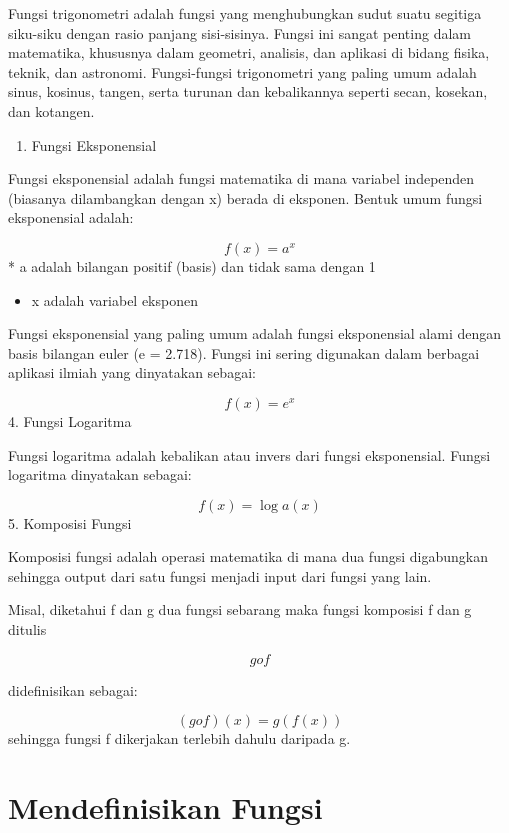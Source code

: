 \documentclass[
]{book}
\providecommand{\tightlist}{%
  \setlength{\itemsep}{0pt}\setlength{\parskip}{0pt}}
\begin{document}
Fungsi trigonometri adalah fungsi yang menghubungkan sudut suatu segitiga siku-siku dengan rasio panjang sisi-sisinya. Fungsi ini sangat penting dalam matematika, khususnya dalam geometri, analisis, dan aplikasi di bidang fisika, teknik, dan astronomi. Fungsi-fungsi trigonometri yang paling umum adalah sinus, kosinus, tangen, serta turunan dan kebalikannya seperti secan, kosekan, dan kotangen.

\begin{enumerate}
\def\labelenumi{\arabic{enumi}.}
\setcounter{enumi}{2}
\tightlist
\item
  Fungsi Eksponensial
\end{enumerate}

Fungsi eksponensial adalah fungsi matematika di mana variabel independen (biasanya dilambangkan dengan x) berada di eksponen. Bentuk umum fungsi eksponensial adalah:

\[f(x)=a^x\]* a adalah bilangan positif (basis) dan tidak sama dengan 1

\begin{itemize}
\tightlist
\item
  x adalah variabel eksponen
\end{itemize}

Fungsi eksponensial yang paling umum adalah fungsi eksponensial alami dengan basis bilangan euler (e = 2.718). Fungsi ini sering digunakan dalam berbagai aplikasi ilmiah yang dinyatakan sebagai:

\[f(x)=e^x\]4. Fungsi Logaritma

Fungsi logaritma adalah kebalikan atau invers dari fungsi eksponensial. Fungsi logaritma dinyatakan sebagai:

\[f(x)= \log a(x)\]5. Komposisi Fungsi

Komposisi fungsi adalah operasi matematika di mana dua fungsi digabungkan sehingga output dari satu fungsi menjadi input dari fungsi yang lain.

Misal, diketahui f dan g dua fungsi sebarang maka fungsi komposisi f dan g ditulis

\[g o f\]

didefinisikan sebagai:

\[(g o f)(x) = g(f(x))\]sehingga fungsi f dikerjakan terlebih dahulu daripada g.

\section{Mendefinisikan Fungsi}\label{mendefinisikan-fungsi}
\end{document}
